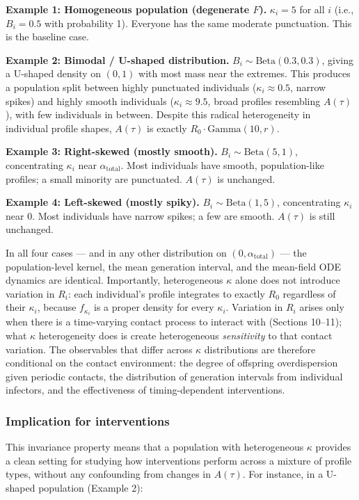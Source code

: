 \documentclass[11pt]{article}
\begin{document}
\textbf{Example 1: Homogeneous population (degenerate $F$).} $\kappa_i = 5$ for all $i$ (i.e., $B_i = 0.5$ with probability 1). Everyone has the same moderate punctuation. This is the baseline case.

\textbf{Example 2: Bimodal / U-shaped distribution.} $B_i \sim \text{Beta}(0.3, 0.3)$, giving a U-shaped density on $(0, 1)$ with most mass near the extremes. This produces a population split between highly punctuated individuals ($\kappa_i \approx 0.5$, narrow spikes) and highly smooth individuals ($\kappa_i \approx 9.5$, broad profiles resembling $A(\tau)$), with few individuals in between. Despite this radical heterogeneity in individual profile shapes, $A(\tau)$ is exactly $R_0 \cdot \text{Gamma}(10, r)$.

\textbf{Example 3: Right-skewed (mostly smooth).} $B_i \sim \text{Beta}(5, 1)$, concentrating $\kappa_i$ near $\alpha_{\text{total}}$. Most individuals have smooth, population-like profiles; a small minority are punctuated. $A(\tau)$ is unchanged.

\textbf{Example 4: Left-skewed (mostly spiky).} $B_i \sim \text{Beta}(1, 5)$, concentrating $\kappa_i$ near 0. Most individuals have narrow spikes; a few are smooth. $A(\tau)$ is still unchanged.

In all four cases --- and in any other distribution on $(0, \alpha_{\text{total}})$ --- the population-level kernel, the mean generation interval, and the mean-field ODE dynamics are identical. Importantly, heterogeneous $\kappa$ alone does not introduce variation in $R_i$: each individual's profile integrates to exactly $R_0$ regardless of their $\kappa_i$, because $f_{\kappa_i}$ is a proper density for every $\kappa_i$. Variation in $R_i$ arises only when there is a time-varying contact process to interact with (Sections 10--11); what $\kappa$ heterogeneity does is create heterogeneous \textit{sensitivity} to that contact variation. The observables that differ across $\kappa$ distributions are therefore conditional on the contact environment: the degree of offspring overdispersion given periodic contacts, the distribution of generation intervals from individual infectors, and the effectiveness of timing-dependent interventions.

\subsubsection{Implication for interventions}

This invariance property means that a population with heterogeneous $\kappa$ provides a clean setting for studying how interventions perform across a mixture of profile types, without any confounding from changes in $A(\tau)$. For instance, in a U-shaped population (Example 2):
\end{document}
